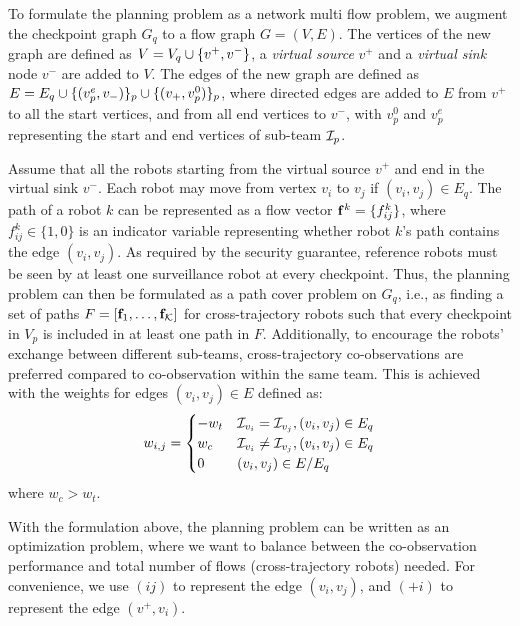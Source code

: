 \documentclass[journal]{IEEEtran}  %
\begin{document}
To formulate the planning problem as a network multi flow problem, we augment the checkpoint graph $G_{q}$ to a flow graph $G=(V, E)$. The vertices of the new graph are defined as $V= V_{q} \cup \{v^{+},v^{-}\}$,  a \emph{virtual source} $v^{+}$ and a \emph{virtual sink} node $v^{-}$ are added to $V$. The edges of the new graph are defined as $ E = E_{q} \cup \{( v^{e}_{p},v_{-})\}_{p} \cup \{(v_{+},v^{0}_{p})\}_{p}$, where directed edges are added to $E$ from $v^{+}$ to all the start vertices, and from all end vertices to $v^{-}$, with $v^0_p$ and $v^e_p$ representing the start and end vertices of sub-team $\mathcal{I}_p$.

Assume that all the robots starting from the virtual source $v^{+}$ and end in the virtual sink $v^{-}$. Each robot may move from vertex $v_{i}$ to $v_{j}$ if $(v_{i},v_{j})\in E_{q}$. The path of a robot $k$ can be represented as a flow vector $\mathbf{f}^{k} = \{ f^{k}_{ij} \}$, where $f^{k}_{ij} \in \{1,0\}$ is an indicator variable representing whether robot $k$'s path contains the edge $(v_{i},v_{j})$. As required by the security guarantee, reference robots must be seen by at least one surveillance robot at every checkpoint. Thus, the planning problem can then be formulated as a path cover problem on $G_{q}$, i.e., as finding a set of paths $F=[\mathbf{f}_{1},\dots, \mathbf{f}_{\mathcal{K}}]$ for cross-trajectory robots such that every checkpoint in $V_{p}$ is included in at least one path in $F$. Additionally, to encourage the robots' exchange between different sub-teams, cross-trajectory co-observations are preferred compared to co-observation within the same team. This is achieved with the weights for edges $(v_{i},v_{j})\in E$ defined as:
\begin{equation}
	w_{i,j}=\begin{cases}
	-w_{t} & \mathcal{I}_{v_{i}}=\mathcal{I}_{v_{j}}, (v_{i},v_{j})\in E_{q}\\
	w_{c} & \mathcal{I}_{v_{i}} \neq \mathcal{I}_{v_{j}}, (v_{i},v_{j})\in E_{q}\\
	0 &  (v_{i},v_{j})\in E / E_{q} 
	\end{cases}
\end{equation}
where $w_{c} > w_{t}$. 

With the formulation above, the planning problem can be written as an optimization problem, where we want to balance between the co-observation performance and total number of flows (cross-trajectory robots) needed. For convenience, we use $(ij)$ to represent the edge $(v_{i},v_{j})$, and $(+i)$ to represent the edge $(v^{+},v_{i})$.
\end{document}
